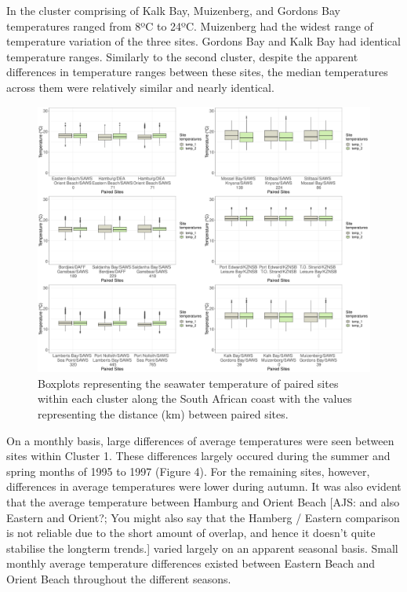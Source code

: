 \documentclass[12pt,A4paper,]{article}
\begin{document}
In the cluster comprising of Kalk Bay, Muizenberg, and Gordons Bay
temperatures ranged from 8ºC to 24ºC. Muizenberg had the widest range of
temperature variation of the three sites. Gordons Bay and Kalk Bay had
identical temperature ranges. Similarly to the second cluster, despite
the apparent differences in temperature ranges between these sites, the
median temperatures across them were relatively similar and nearly
identical.

\begin{figure}
\centering
\includegraphics{../figures/combined_plot.pdf}
\caption{Boxplots representing the seawater temperature of paired sites
within each cluster along the South African coast with the values
representing the distance (km) between paired sites.}
\end{figure}

On a monthly basis, large differences of average temperatures were seen
between sites within Cluster 1. These differences largely occured during
the summer and spring months of 1995 to 1997 (Figure 4). For the
remaining sites, however, differences in average temperatures were lower
during autumn. It was also evident that the average temperature between
Hamburg and Orient Beach {[}AJS: and also Eastern and Orient?; You might
also say that the Hamberg / Eastern comparison is not reliable due to
the short amount of overlap, and hence it doesn't quite stabilise the
longterm trends.{]} varied largely on an apparent seasonal basis. Small
monthly average temperature differences existed between Eastern Beach
and Orient Beach throughout the different seasons.
\end{document}
